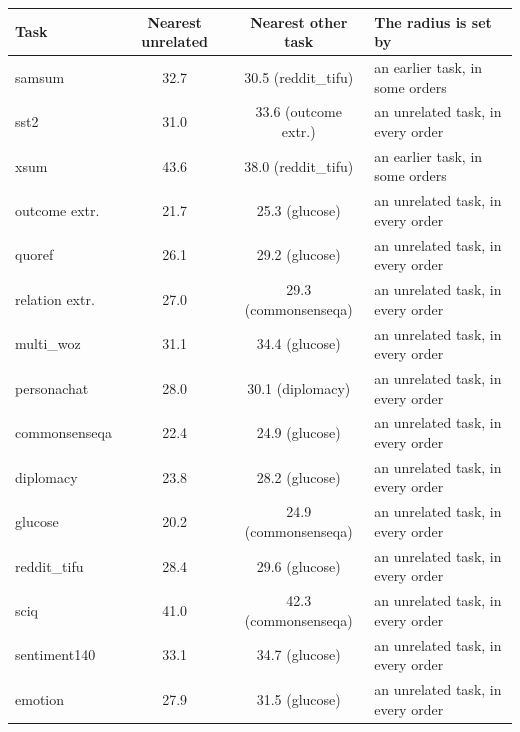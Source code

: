 \begin{tabular}{lccl}
    \toprule
    Task & Nearest unrelated & Nearest other task & The radius is set by \\
    \midrule
    samsum & 32.7 & 30.5 (reddit\_tifu) & an earlier task, in some orders \\
    sst2 & 31.0 & 33.6 (outcome extr.) & an unrelated task, in every order \\
    xsum & 43.6 & 38.0 (reddit\_tifu) & an earlier task, in some orders \\
    outcome extr. & 21.7 & 25.3 (glucose) & an unrelated task, in every order \\
    quoref & 26.1 & 29.2 (glucose) & an unrelated task, in every order \\
    relation extr. & 27.0 & 29.3 (commonsenseqa) & an unrelated task, in every order \\
    multi\_woz & 31.1 & 34.4 (glucose) & an unrelated task, in every order \\
    personachat & 28.0 & 30.1 (diplomacy) & an unrelated task, in every order \\
    commonsenseqa & 22.4 & 24.9 (glucose) & an unrelated task, in every order \\
    diplomacy & 23.8 & 28.2 (glucose) & an unrelated task, in every order \\
    glucose & 20.2 & 24.9 (commonsenseqa) & an unrelated task, in every order \\
    reddit\_tifu & 28.4 & 29.6 (glucose) & an unrelated task, in every order \\
    sciq & 41.0 & 42.3 (commonsenseqa) & an unrelated task, in every order \\
    sentiment140 & 33.1 & 34.7 (glucose) & an unrelated task, in every order \\
    emotion & 27.9 & 31.5 (glucose) & an unrelated task, in every order \\
    \bottomrule
\end{tabular}
